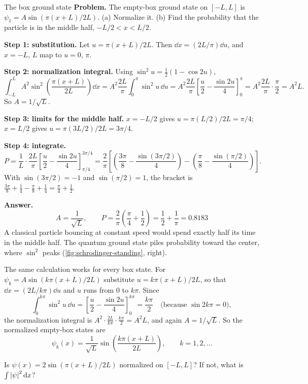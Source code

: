 \begin{sample}{The box ground state}
\textbf{Problem.} The empty-box ground state on $[-L,L]$ is $\psi_1=A\sin(\pi(x+L)/2L)$. (a) Normalize it. (b) Find the probability that the particle is in the middle half, $-L/2<x<L/2$.

\textbf{Step 1: substitution.} Let $u=\pi(x+L)/2L$. Then $\dd x=(2L/\pi)\dd u$, and $x=-L,\,L$ map to $u=0,\,\pi$.

\textbf{Step 2: normalization integral.} Using $\sin^2u=\tfrac12(1-\cos2u)$,
\[
\int_{-L}^{L}A^2\sin^2\!\left(\frac{\pi(x+L)}{2L}\right)\dd x
=A^2\frac{2L}{\pi}\int_0^\pi\sin^2u\,\dd u
=A^2\frac{2L}{\pi}\left[\frac u2-\frac{\sin2u}{4}\right]_0^\pi
=A^2\frac{2L}{\pi}\cdot\frac\pi2=A^2L.
\]
So $A=1/\sqrt L$.

\textbf{Step 3: limits for the middle half.} $x=-L/2$ gives $u=\pi(L/2)/2L=\pi/4$; $x=L/2$ gives $u=\pi(3L/2)/2L=3\pi/4$.

\textbf{Step 4: integrate.}
\[
P=\frac1L\cdot\frac{2L}{\pi}\left[\frac u2-\frac{\sin2u}4\right]_{\pi/4}^{3\pi/4}
=\frac2\pi\left[\left(\frac{3\pi}8-\frac{\sin(3\pi/2)}4\right)-\left(\frac\pi8-\frac{\sin(\pi/2)}4\right)\right].
\]
With $\sin(3\pi/2)=-1$ and $\sin(\pi/2)=1$, the bracket is $\frac{3\pi}8+\frac14-\frac\pi8+\frac14=\frac\pi4+\frac12$.

\textbf{Answer.}
\[
\boxed{A=\frac1{\sqrt L},\qquad P=\frac2\pi\left(\frac\pi4+\frac12\right)=\frac12+\frac1\pi=0.8183}
\]
A classical particle bouncing at constant speed would spend exactly half its time in the middle half. The quantum ground state piles probability toward the center, where $\sin^2$ peaks (\cref{fig:schrodinger-standing}, right).
\end{sample}

The same calculation works for every box state. For $\psi_k=A\sin(k\pi(x+L)/2L)$ substitute $u=k\pi(x+L)/2L$, so that $\dd x=(2L/k\pi)\dd u$ and $u$ runs from $0$ to $k\pi$. Since
\[
\int_0^{k\pi}\sin^2u\,\dd u=\left[\frac u2-\frac{\sin2u}4\right]_0^{k\pi}=\frac{k\pi}2\quad\text{(because $\sin2k\pi=0$)},
\]
the normalization integral is $A^2\cdot\frac{2L}{k\pi}\cdot\frac{k\pi}{2}=A^2L$, and again $A=1/\sqrt L$. So the normalized empty-box states are
\begin{equation}
\psi_k(x)=\frac1{\sqrt L}\sin\!\left(\frac{k\pi(x+L)}{2L}\right),\qquad k=1,2,\dots
\label{eq:schrodinger-box-states}
\end{equation}

\begin{checkpoint}
Is $\psi(x)=2\sin(\pi(x+L)/2L)$ normalized on $[-L,L]$? If not, what is $\int\left\lvert \psi\right\rvert^2\mathrm{d} x$?
\end{checkpoint}

